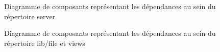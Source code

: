 \documentclass[a4paper]{report}
\begin{document}
\begin{figure}[H]
    \caption{\label{3} Diagramme de composants représentant les dépendances au sein du répertoire server}
\end{figure}

\begin{figure}[H]
    \caption{\label{3} Diagramme de composants représentant les dépendances au sein du répertoire lib/file et views}
\end{figure}
\end{document}
